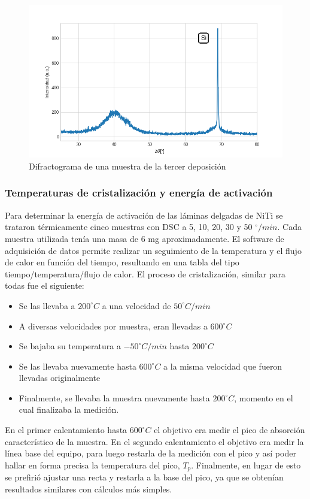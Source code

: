 \documentclass[12pt]{article}
\theoremstyle{definition}
\theoremstyle{remark}
\begin{document}
{\begin{figure}[H]
 	\centering
	\includegraphics[scale=0.6]{img/RX_amorfo.png}
 	\caption{Difractograma de una muestra de la tercer deposición}
	\label{amorfo}
\end{figure}


\subsubsection{Temperaturas de cristalización y energía de activación}

Para determinar la energía de activación de las láminas delgadas de NiTi se trataron térmicamente cinco muestras con DSC a 5, 10, 20, 30 y 50 $^{\circ}/min$. Cada muestra utilizada tenía una masa de 6 mg aproximadamente. El software de adquisición de datos permite realizar un seguimiento de la temperatura y el flujo de calor en función del tiempo, resultando en una tabla del tipo tiempo/temperatura/flujo de calor. El proceso de cristalización, similar para todas fue el siguiente:

\begin{itemize}
\item Se las llevaba a $200^{\circ}C$ a una velocidad de $50^{\circ}C/min$
\item A diversas velocidades por muestra, eran llevadas a $600^{\circ}C$
\item Se bajaba su temperatura a $-50^{\circ}C/min$ hasta $200^{\circ}C$
\item Se las llevaba nuevamente hasta $600^{\circ}C$ a la misma velocidad que fueron llevadas originalmente
\item Finalmente, se llevaba la muestra nuevamente hasta $200^{\circ}C$, momento en el cual finalizaba la medición.
\end{itemize}
En el primer calentamiento hasta $600^{\circ}C$ el objetivo era medir el pico de absorción característico de la muestra. En el segundo calentamiento el objetivo era medir la línea base del equipo, para luego restarla de la medición con el pico y así poder hallar en forma precisa la temperatura del pico, $T_p$. Finalmente, en lugar de esto se prefirió ajustar una recta y restarla a la base del pico, ya que se obtenían resultados similares con cálculos más simples.

}
\end{document}

